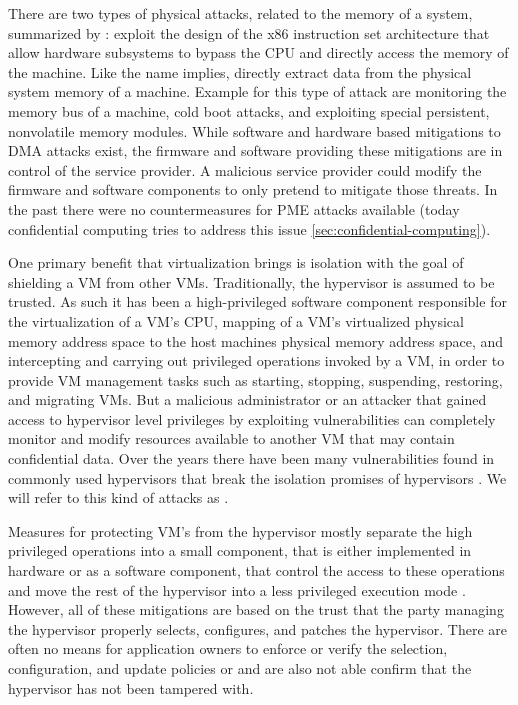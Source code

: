 \begin{description}
    There are two types of physical attacks, related to the memory of a system,
    summarized by \citeauthor{weis2014protecting} \cite{weis2014protecting}:
     exploit the design of the x86
    instruction set architecture that allow hardware subsystems to bypass the
    CPU and directly access the memory of the machine. Like the name implies,
     directly extract data from
    the physical system memory of a machine. Example for this type of attack are
    monitoring the memory bus of a machine, cold boot attacks, and exploiting
    special persistent, nonvolatile memory modules. While software and hardware
    based mitigations to DMA attacks exist, the firmware and software providing
    these mitigations are in control of the service provider. A malicious
    service provider could modify the firmware and software components to only
    pretend to mitigate those threats. In the past there were no countermeasures
    for PME attacks available (today confidential computing tries to address
    this issue \ref{sec:confidential-computing}).

    One primary benefit that virtualization brings is isolation with the goal of
    shielding a VM from other VMs. Traditionally, the hypervisor is assumed to
    be trusted. As such it has been a high-privileged software component
    responsible for the virtualization of a VM's CPU, mapping of a VM's
    virtualized physical memory address space to the host machines physical
    memory address space, and intercepting and carrying out privileged
    operations invoked by a VM, in order to provide VM management tasks such as
    starting, stopping, suspending, restoring, and migrating VMs. But a
    malicious administrator or an attacker that gained access to hypervisor
    level privileges by exploiting vulnerabilities can completely monitor and
    modify resources available to another VM that may contain confidential data.
    Over the years there have been many vulnerabilities found in commonly used
    hypervisors that break the isolation promises of hypervisors
    \cite{perezbotero2013hypervisorvulnerabilities,
      reuben2007surveyvirtualmachinesecurity}. We will refer to this kind of
    attacks as .

    Measures for protecting VM's from the hypervisor mostly separate the high
    privileged operations into a small component, that is either implemented in
    hardware or as a software component, that control the access to these
    operations and move the rest of the hypervisor into a less privileged
    execution mode \cite{jin2011securevirtualization,
    szefer2012hypvervisorsecurevirtualization, li2019protectingvmfromhypervisor,
    mi2020disaggregatednestedvirtualization}. However, all of these mitigations
    are based on the trust that the party managing the hypervisor properly
    selects, configures, and patches the hypervisor. There are often no means
    for application owners to enforce or verify the selection, configuration,
    and update policies or and are also not able confirm that the hypervisor has
    not been tampered with.


\end{description}
